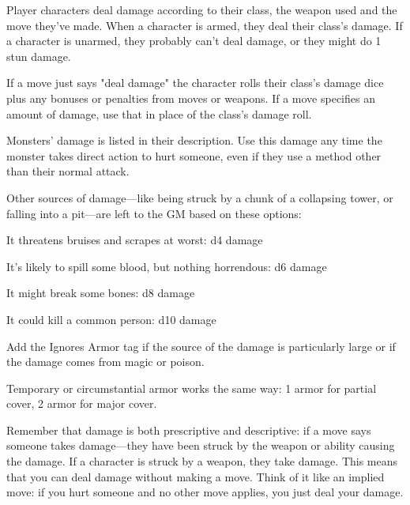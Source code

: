        

Player characters deal damage according to their class, the weapon used and the move they've made. When a character is armed, they deal their class's damage. If a character is unarmed, they probably can't deal damage, or they might do 1 stun damage.

       

If a move just says "deal damage" the character rolls their class's damage dice plus any bonuses or penalties from moves or weapons. If a move specifies an amount of damage, use that in place of the class's damage roll.

       

Monsters' damage is listed in their description. Use this damage any time the monster takes direct action to hurt someone, even if they use a method other than their normal attack.

       

Other sources of damage—like being struck by a chunk of a collapsing tower, or falling into a pit—are left to the GM based on these options:

       
\startitemize[1,packed]
         
\item It threatens bruises and scrapes at worst: d4 damage

         
\item It's likely to spill some blood, but nothing horrendous: d6 damage

         
\item It might break some bones: d8 damage

         
\item It could kill a common person: d10 damage

       
\stopitemize
       

Add the Ignores Armor tag if the source of the damage is particularly large or if the damage comes from magic or poison.

       

Temporary or circumstantial armor works the same way: 1 armor for partial cover, 2 armor for major cover.

       

Remember that damage is both prescriptive and descriptive: if a move says someone takes damage—they have been struck by the weapon or ability causing the damage. If a character is struck by a weapon, they take damage. This means that you can deal damage without making a move. Think of it like an implied move: if you hurt someone and no other move applies, you just deal your damage.

